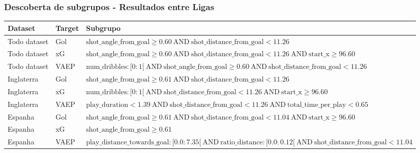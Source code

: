 \documentclass{beamer}
\begin{document}
\begin{frame}
\frametitle{Descoberta de subgrupos - Resultados entre Ligas}
\begin{table}[H]
    \centering
    \fontsize{6}{10}\selectfont %
    \begin{tabularx}{\textwidth}{|l|l|X|}
        \hline
        \textbf{Dataset} & \textbf{Target} & \textbf{Subgrupo} \\
        \hline
        Todo dataset & Gol & $ \text{shot\_angle\_from\_goal} \geq 0.60 \ \text{AND} \ \text{shot\_distance\_from\_goal} < 11.26 $ \\
        \hline
        Todo dataset & xG & $ \text{shot\_angle\_from\_goal} \geq 0.60 \ \text{AND} \ \text{shot\_distance\_from\_goal} < 11.26 \ \text{AND} \ \text{start\_x} \geq 96.60 $ \\
        \hline
        Todo dataset & VAEP & $ \text{num\_dribbles} : [0:1[ \ \text{AND} \ \text{shot\_angle\_from\_goal} \geq 0.60 \ \text{AND} \ \text{shot\_distance\_from\_goal} < 11.26 $ \\
        \hline
        Inglaterra & Gol & $ \text{shot\_angle\_from\_goal} \geq 0.61 \ \text{AND} \ \text{shot\_distance\_from\_goal} < 11.26 $ \\
        \hline
        Inglaterra & xG & $ \text{num\_dribbles} : [0:1[ \ \text{AND} \ \text{shot\_distance\_from\_goal} < 11.26 \ \text{AND} \ \text{start\_x} \geq 96.60 $ \\
        \hline
        Inglaterra & VAEP & $ \text{play\_duration} < 1.39 \ \text{AND} \ \text{shot\_distance\_from\_goal} < 11.26 \ \text{AND} \ \text{total\_time\_per\_play} < 0.65 $ \\
        \hline
        Espanha & Gol & $ \text{shot\_angle\_from\_goal} \geq 0.61 \ \text{AND} \ \text{shot\_distance\_from\_goal} < 11.04 \ \text{AND} \ \text{start\_x} \geq 96.60 $ \\
        \hline
        Espanha & xG & $ \text{shot\_angle\_from\_goal} \geq 0.61 $ \\
        \hline
        Espanha & VAEP & $ \text{play\_distance\_towards\_goal} : [0.0:7.35[ \ \text{AND} \ \text{ratio\_distance} : [0.0:0.12[ \ \text{AND} \ \text{shot\_distance\_from\_goal} < 11.04 $ \\
        \hline
    \end{tabularx}
    \label{tab:resultsSD}
\end{table}
\end{frame}
\end{document}
